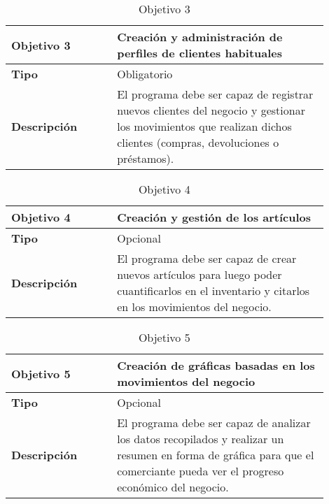 \begin{table}[htb!]
	\centering %
	\begin{tabular}{|p{0.3\linewidth}|p{0.6\linewidth}|}
		\hline %
		\rowcolor{grayshade} 
		\textbf{Objetivo 3} & \textbf{Creación y administración de perfiles de clientes habituales} \\
		\hline %
		\textbf{Tipo} & Obligatorio \\
		\hline
		\textbf{Descripción} & El programa debe ser capaz de registrar nuevos clientes del negocio y gestionar los movimientos que realizan dichos clientes (compras, devoluciones o préstamos). \\
		\hline
	\end{tabular}
	\caption{Objetivo 3}
\end{table}

\begin{table}[htb!]
	\centering %
	\begin{tabular}{|p{0.3\linewidth}|p{0.6\linewidth}|}
		\hline %
		\rowcolor{grayshade} 
		\textbf{Objetivo 4} & \textbf{Creación y gestión de los artículos} \\
		\hline %
		\textbf{Tipo} & Opcional \\
		\hline
		\textbf{Descripción} & El programa debe ser capaz de crear nuevos artículos para luego poder cuantificarlos en el inventario y citarlos en los movimientos del negocio.  \\
		\hline
	\end{tabular}
	\caption{Objetivo 4}
\end{table}

\begin{table}[H]
	\centering %
	\begin{tabular}{|p{0.3\linewidth}|p{0.6\linewidth}|}
		\hline %
		\rowcolor{grayshade} 
		\textbf{Objetivo 5} & \textbf{Creación de gráficas basadas en los movimientos del negocio} \\
		\hline %
		\textbf{Tipo} & Opcional \\
		\hline
		\textbf{Descripción} & El programa debe ser capaz de analizar los datos recopilados y realizar un resumen en forma de gráfica para que el comerciante pueda ver el progreso económico del negocio.  \\
		\hline
	\end{tabular}
	\caption{Objetivo 5}
\end{table}



